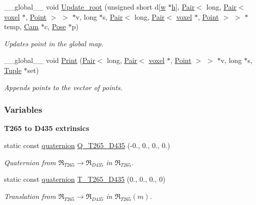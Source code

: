 \begin{DoxyCompactItemize}
\+\_\+\+\_\+global\+\_\+\+\_\+ void \hyperlink{Voxel_8cuh_a935fc0c42796b23607cf6f81a1e95e8d}{Update\+\_\+root} (unsigned short d\mbox{[}\hyperlink{Camera_8hpp_a66326676d44c838441a4dc39c85f599b}{w} $\ast$\hyperlink{Camera_8hpp_a3f40fea9b1040e381f08ddd4b026765d}{h}\mbox{]}, \hyperlink{classPair}{Pair}$<$ long, \hyperlink{classPair}{Pair}$<$ \hyperlink{classvoxel}{voxel} $\ast$, \hyperlink{structPoint}{Point} $>$ $>$ $\ast$v, long $\ast$s, \hyperlink{classPair}{Pair}$<$ long, \hyperlink{classPair}{Pair}$<$ \hyperlink{classvoxel}{voxel} $\ast$, \hyperlink{structPoint}{Point} $>$ $>$ $\ast$temp, \hyperlink{structCam}{Cam} $\ast$c, \hyperlink{structPose}{Pose} $\ast$p)
\begin{DoxyCompactList}\small\item\em Updates point in the global map. \end{DoxyCompactList}\item 
\+\_\+\+\_\+global\+\_\+\+\_\+ void \hyperlink{Voxel_8cuh_afc844d313aa2b2353c757fb063b74b96}{Print} (\hyperlink{classPair}{Pair}$<$ long, \hyperlink{classPair}{Pair}$<$ \hyperlink{classvoxel}{voxel} $\ast$, \hyperlink{structPoint}{Point} $>$ $>$ $\ast$v, long $\ast$s, \hyperlink{structTuple}{Tuple} $\ast$set)
\begin{DoxyCompactList}\small\item\em Appends points to the vector of points. \end{DoxyCompactList}\end{DoxyCompactItemize}
\subsubsection*{Variables}
\begin{Indent}{\bf T265 to D435 extrinsics}\par
\begin{DoxyCompactItemize}
\item 
static const \hyperlink{classquaternion}{quaternion} \hyperlink{Voxel_8cuh_ae638036c15a578080c34013047df2c4f}{Q\+\_\+\+T265\+\_\+\+D435} (-\/0., 0., 0., 0.)
\begin{DoxyCompactList}\small\item\em Quaternion from $\mathfrak{R}_{T265} \to \mathfrak{R}_{D435}$ in $\mathfrak{R}_{T265}$. \end{DoxyCompactList}\item 
static const \hyperlink{classquaternion}{quaternion} \hyperlink{Voxel_8cuh_a084c6bfb66f9daa4728fe8355861f1a4}{T\+\_\+\+T265\+\_\+\+D435} (0., 0., 0., 0)
\begin{DoxyCompactList}\small\item\em Translation from $\mathfrak{R}_{T265} \to \mathfrak{R}_{D435}$ in $\mathfrak{R}_{T265} (m)$. \end{DoxyCompactList}\end{DoxyCompactItemize}
\end{Indent}


